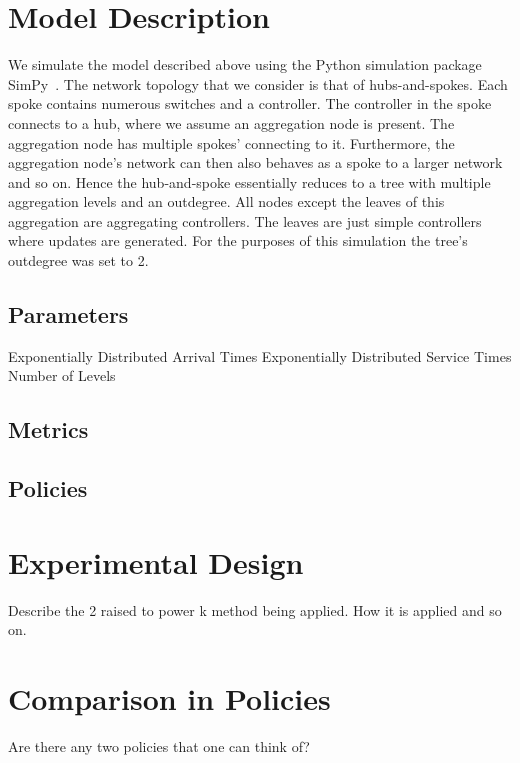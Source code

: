 \documentclass[conference]{IEEEtran}
\begin{document}


\section{Model Description}
We simulate the model described above using the Python simulation package SimPy~\cite{simpy}. The network topology that we consider is that of hubs-and-spokes. Each spoke contains numerous switches and a controller. The controller in the spoke connects to a hub, where we assume an aggregation node is present. The aggregation node has multiple spokes' connecting to it. Furthermore, the aggregation node's network can then also behaves as a spoke to a larger network and so on. Hence the hub-and-spoke essentially reduces to a tree with multiple aggregation levels and an outdegree. All nodes except the leaves of this aggregation are aggregating controllers. The leaves are just simple controllers where updates are generated. For the purposes of this simulation the tree's outdegree was set to 2.

\subsection{Parameters}
Exponentially Distributed Arrival Times
Exponentially Distributed Service Times
Number of Levels 

\subsection{Metrics}
\subsection{Policies}

\section{Experimental Design}
Describe the 2 raised to power k method being applied. How it is applied and so on.

\section{Comparison in Policies}
Are there any two policies that one can think of?
\end{document}

